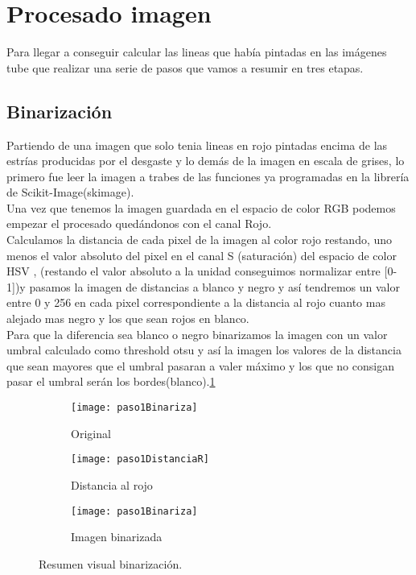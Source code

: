 \section{Procesado imagen}
Para llegar a conseguir calcular las lineas que había pintadas en las imágenes tube que realizar una serie de pasos que vamos a resumir en tres etapas.
\subsection{Binarización}
Partiendo de una imagen que solo tenia lineas en rojo pintadas encima de las estrías producidas por el desgaste y lo demás de la imagen en escala de grises, lo primero fue leer la imagen a trabes de las funciones ya programadas en la librería de Scikit-Image(skimage).\\
Una vez que tenemos la imagen guardada en el espacio de color RGB podemos empezar el procesado quedándonos con el canal Rojo.\\
Calculamos la distancia de cada pixel de la imagen al color rojo restando, uno menos el valor absoluto del pixel en el canal S (saturación) del espacio de color HSV , (restando el valor absoluto a la unidad conseguimos normalizar entre [0-1])y pasamos la imagen de distancias a blanco y negro y así tendremos un valor entre 0 y 256 en cada pixel correspondiente a la distancia al rojo cuanto mas alejado mas negro y los que sean rojos en blanco.\\
Para que la diferencia sea blanco o negro binarizamos la imagen con un valor umbral calculado como threshold otsu y así la imagen los valores de la distancia que sean mayores que el umbral pasaran a valer máximo y los que no consigan pasar el umbral serán los bordes(blanco).\ref{fig:5.4}


\begin{figure}
\begin{subfigure}[c]{.5\linewidth}
\centering\large \texttt{[image: paso1Binariza]}
\caption{Original}
\end{subfigure}%
\begin{subfigure}[c]{.5\linewidth}
\centering\large \texttt{[image: paso1DistanciaR]}
\caption{Distancia al rojo}
\end{subfigure}
\begin{subfigure}[c]{.5\linewidth}
\centering\large \texttt{[image: paso1Binariza]}
\caption{Imagen binarizada}
\end{subfigure}
\caption{Resumen visual binarización.}\label{fig:5.4}
\end{figure}



